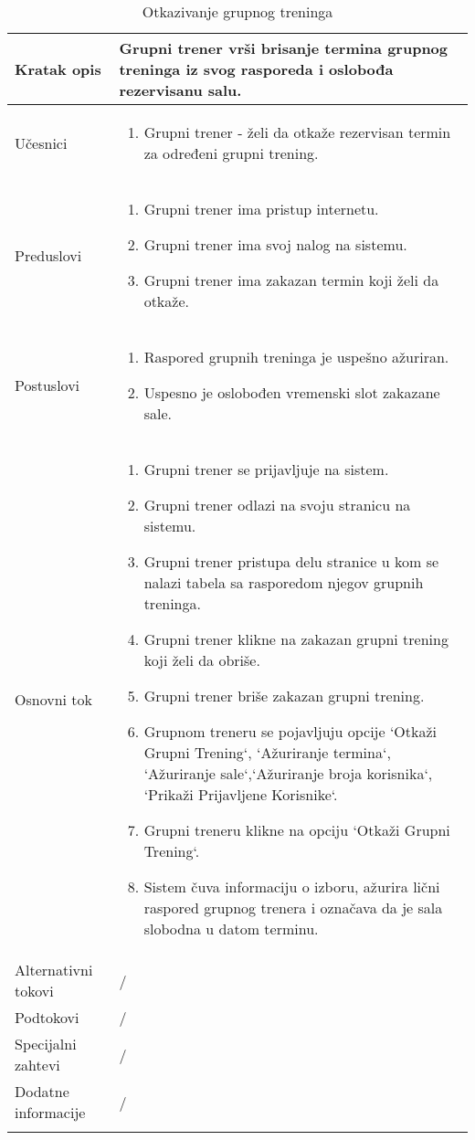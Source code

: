 \documentclass[../grupniTreninzi.tex]{subfiles}
\begin{document}
\begin{longtable}{| p{} | p{} |} 
\hline
    Kratak opis & Grupni trener vrši brisanje termina grupnog treninga iz svog rasporeda i oslobođa rezervisanu salu.
    \\
\hline    
    Učesnici &
    \begin{enumerate}
        \item Grupni trener - želi da otkaže rezervisan termin za određeni grupni trening. 
    \end{enumerate}\\
\hline
   Preduslovi & 
   \begin{enumerate}
        \item Grupni trener ima pristup internetu.
        \item Grupni trener ima svoj nalog na sistemu.
        \item Grupni trener ima zakazan termin koji želi da otkaže.
    \end{enumerate}\\
\hline  
    Postuslovi &
    \begin{enumerate}
        \item Raspored grupnih treninga je uspešno ažuriran.
        \item Uspesno je oslobođen vremenski slot zakazane sale.
    \end{enumerate}\\
\hline
    Osnovni tok & 
    \begin{enumerate}
        \item Grupni trener se prijavljuje na sistem.
        \item Grupni trener odlazi na svoju stranicu na sistemu.
        \item Grupni trener pristupa delu stranice u kom se nalazi tabela sa rasporedom njegov grupnih treninga.
        \item Grupni trener klikne na zakazan grupni trening koji želi da obriše.
        \item Grupni trener briše zakazan grupni trening.
                
        \item Grupnom treneru se pojavljuju opcije `Otkaži Grupni Trening`, `Ažuriranje termina`, `Ažuriranje sale`,`Ažuriranje broja korisnika`, `Prikaži Prijavljene Korisnike`.
        \item Grupni treneru klikne na opciju  `Otkaži Grupni Trening`. 
        \item Sistem čuva informaciju o izboru, ažurira lični raspored grupnog trenera i označava da je sala slobodna u datom terminu.
    \end{enumerate}\\
\hline
    Alternativni tokovi & /\\
\hline
    Podtokovi & /\\
\hline
    Specijalni zahtevi & /\\
\hline
    Dodatne informacije & /\\
\hline
\caption{Otkazivanje grupnog treninga} %
\end{longtable}
\end{document}
